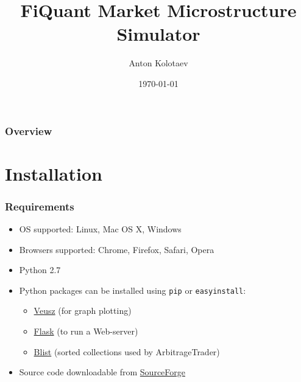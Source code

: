 \documentclass{beamer}
\title[Market simulator]{FiQuant Market Microstructure Simulator} %
\author{Anton Kolotaev} %
\institute[ECP] %
{
Ecole Centrale de Paris \\ %
\medskip
\textit{anton.kolotaev@gmail.com} %
}
\date{\today} %
\begin{document}
\begin{frame}
\titlepage %
\end{frame}

\begin{frame}
\frametitle{Overview} %
\tableofcontents %
\end{frame}


\section{Installation} %
\begin{frame}
\frametitle{Requirements}
\begin{itemize}
\item OS supported: Linux, Mac OS X, Windows
\item Browsers supported: Chrome, Firefox, Safari, Opera
\item Python 2.7
\item Python packages can be installed using \texttt{pip} or \texttt{easyinstall}:
\begin{itemize}
\item \href{http://home.gna.org/veusz/}{Veusz} (for graph plotting)
\item \href{http://flask.pocoo.org}{Flask} (to run a Web-server)
\item \href{https://pypi.python.org/pypi/blist/}{Blist} (sorted collections used by ArbitrageTrader) 
\end{itemize}
\item Source code downloadable from \href{http://sourceforge.net/p/marketsimulator/svn/HEAD/tree/DevAnton/v3/}{SourceForge}
\end{itemize}

\end{frame}
\end{document}
